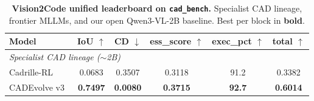                                                                                                                                                     
  \begin{table}[t]                           
  \centering                                                                                                                                          
  \small                                                          
  \setlength{\tabcolsep}{5pt}                                                                                                                         
  \renewcommand{\arraystretch}{1.15}                                                                                                                  
  \caption{\textbf{Vision2Code unified leaderboard on \texttt{cad\_bench}.} Specialist CAD lineage, frontier MLLMs, and our open Qwen3-VL-2B baseline.
   Best per block in \textbf{bold}.}                                                                                                                  
  \label{tab:codegen_unified}
  \begin{tabular}{l c c c c c}                                                                                                                        
  \toprule                                                                                                                                            
  Model                                                                                                                                               
   & IoU $\uparrow$                                                                                                                                   
   & CD $\downarrow$                                                                                                                                  
   & ess\_score $\uparrow$
   & exec\_pct $\uparrow$                                                                                                                             
   & total $\uparrow$ \\                                          
  \midrule                                
  \multicolumn{6}{l}{\textit{Specialist CAD lineage ($\sim$2B)}} \\
  Cadrille-RL~\citep{Kolodiazhnyi2026}    & 0.0683          & 0.3507          & 0.3118          & 91.2          & 0.3382 \\                           
  CADEvolve v3~\citep{Elistratov2026}     & \textbf{0.7497} & \textbf{0.0080} & \textbf{0.3715} & \textbf{92.7} & \textbf{0.6014} \\

\end{tabular}
\end{table}
